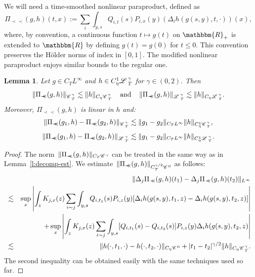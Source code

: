 \documentclass[11pt,reqno]{amsart}
\newcommand{\assign}{:=}
\newcommand{\cdummy}{\cdot}
\newcommand{\precprec}{\prec\!\!\!\prec}
\newcommand{\tmop}[1]{\ensuremath{\operatorname{#1}}}
\newtheorem{lemma}[theorem]{Lemma}
\newcommand{\CC}{\mathscr{C} \hspace{.1em}}
\newcommand{\LL}{\mathscr{L} \hspace{.2em}}
\begin{document}
We will need a time-smoothed nonlinear paraproduct, defined as
\begin{equation}
  \Pi_{\precprec} (g, h) (t, x) \assign \sum_i \int_{y, s} Q_{i, t} (s) P_{i,
  x} (y) (\Delta_i h (g (s, y), t, \cdot)) (x), \label{e:def-nonlinear}
\end{equation}
where, by convention, a continuous function $t \mapsto g (t)$ on
$\mathbbm{R}_+$ is extended to $\mathbbm{R}$ by defining $g (t) = g (0)$ for
$t \leqslant 0$. This convention preserves the H{\"o}lder norms of index in
$[0, 1]$. The modified nonlinear paraproduct enjoys similar bounds to the
regular one.

\begin{lemma}
  \label{l:nonlinear-est}Let $g \in C_T L^{\infty}$ and $h \in C^1_{\eta}
  \LL_T^{\gamma}$ for $\gamma \in (0, 2)$. Then
  \[ \| \Pi_{\precprec} (g, h) \|_{\CC^{\gamma}_T} \lesssim \| h \|_{C_{\eta}
     \CC_T^{\gamma}} \quad \tmop{and} \quad \| \Pi_{\precprec} (g, h)
     \|_{\LL^{\gamma}_T} \lesssim \| h \|_{C_{\eta} \LL_T^{\gamma}} . \]
  Moreover, $\Pi_{\precprec} (g, h)$ is linear in $h$ and:
  \[ \| \Pi_{\precprec} (g_1, h) - \Pi_{\precprec} (g_2, h)
     \|_{\CC_T^{\gamma}} \lesssim \| g_1 - g_2 \|_{C_T L^{\infty}} \| h
     \|_{C^1_{\eta} \CC_T^{\gamma}}, \]
  \[ \| \Pi_{\precprec} (g_1, h) - \Pi_{\precprec} (g_2, h)
     \|_{\LL_T^{\gamma}} \lesssim \| g_1 - g_2 \|_{C_T L^{\infty}} \| h
     \|_{C^1_{\eta} \LL_T^{\gamma}} . \]
\end{lemma}

\begin{proof}
  The norm~$\| \Pi_{\precprec} (g, h) \|_{C_T \CC^{\gamma}}$ can be treated in
  the same way as in Lemma~\ref{l:decomp-est}. We estimate~$\| \Pi_{\precprec}
  (g, h) \|_{C_T^{\gamma / 2} \CC^0}$ as follows:
  \begin{eqnarray*}
    &  & \| \Delta_j \Pi_{\precprec} (g, h) (t_1) - \Delta_j \Pi_{\precprec}
    (g, h) (t_2) \|_{L^{\infty}}\\
    & \lesssim & \sup_x \left| \int_z K_{j, x} (z) \sum_{i \sim j} \int_{y,
    s} Q_{i, t_1} (s) P_{i, z} (y) [\Delta_i h (g (s, y), t_1, z) - \Delta_i h
    (g (s, y), t_2, z)] \right|\\
    &  & + \sup_x \left| \int_z K_{j, x} (z) \sum_{i \sim j} \int_{y, s}
    [Q_{i, t_1} (s) - Q_{i, t_2} (s)] P_{i, z} (y) \Delta_i h (g (s, y), t_2,
    z) \right|\\
    & \lesssim & \| h (\cdummy, t_1, \cdummy) - h (\cdummy, t_2, \cdummy)
    \|_{C_{\eta} \CC^0} + | t_1 - t_2 |^{\gamma / 2} \| h \|_{C_{\eta}
    \CC_T^{\gamma}} .
  \end{eqnarray*}
  The second inequality can be obtained easily with the same techniques used
  so far.
\end{proof}
\end{document}
